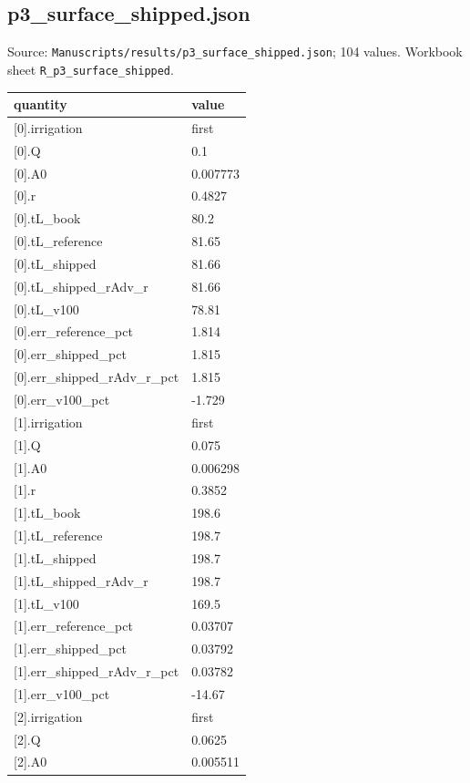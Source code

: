 \subsection*{p3\_surface\_shipped.json}
\noindent\small Source: \nolinkurl{Manuscripts/results/p3_surface_shipped.json}; 104 values. Workbook sheet \texttt{R\_p3\_surface\_shipped}.\par
{\scriptsize\begin{longtable}{p{}p{}}\toprule\textbf{quantity} & \textbf{value}\\\midrule\endhead
{}[0].irrigation & first\\
{}[0].Q & 0.1\\
{}[0].A0 & 0.007773\\
{}[0].r & 0.4827\\
{}[0].tL\_book & 80.2\\
{}[0].tL\_reference & 81.65\\
{}[0].tL\_shipped & 81.66\\
{}[0].tL\_shipped\_rAdv\_r & 81.66\\
{}[0].tL\_v100 & 78.81\\
{}[0].err\_reference\_pct & 1.814\\
{}[0].err\_shipped\_pct & 1.815\\
{}[0].err\_shipped\_rAdv\_r\_pct & 1.815\\
{}[0].err\_v100\_pct & -1.729\\
{}[1].irrigation & first\\
{}[1].Q & 0.075\\
{}[1].A0 & 0.006298\\
{}[1].r & 0.3852\\
{}[1].tL\_book & 198.6\\
{}[1].tL\_reference & 198.7\\
{}[1].tL\_shipped & 198.7\\
{}[1].tL\_shipped\_rAdv\_r & 198.7\\
{}[1].tL\_v100 & 169.5\\
{}[1].err\_reference\_pct & 0.03707\\
{}[1].err\_shipped\_pct & 0.03792\\
{}[1].err\_shipped\_rAdv\_r\_pct & 0.03782\\
{}[1].err\_v100\_pct & -14.67\\
{}[2].irrigation & first\\
{}[2].Q & 0.0625\\
{}[2].A0 & 0.005511\\

\end{longtable}}

